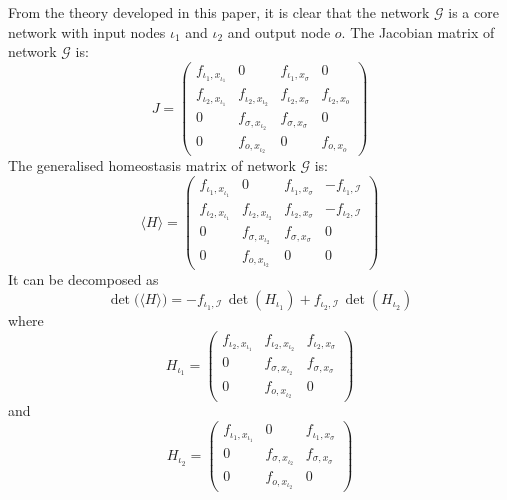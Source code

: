 \documentclass[a4paper,fleqn]{cas-dc}
\begin{document}
From the theory developed in this paper, it is clear that the network $\mathcal{G}$ is a core network with input nodes $\iota_{1}$ and $\iota_{2}$ and output node $o$.
The Jacobian matrix of network $\mathcal{G}$ is:
\begin{equation} \label{jacobian_matrix_e_coli}
J = 
\begin{pmatrix} 
f_{\iota_1, x_{\iota_1}} & 0 & f_{\iota_1, x_{\sigma}} & 0 \\
f_{\iota_2, x_{\iota_1}} & f_{\iota_2, x_{\iota_2}} & f_{\iota_2, x_{\sigma}} & f_{\iota_2, x_o} \\
0 & f_{\sigma, x_{\iota_2}} & f_{\sigma, x_{\sigma}} & 0 \\
0 & f_{o, x_{\iota_2}} & 0 & f_{o,x_o}
\end{pmatrix}
\end{equation}
The generalised homeostasis matrix of network $\mathcal{G}$ is:
\begin{equation} \label{homeostasis_matrix_e_coli}
\langle H \rangle = 
\begin{pmatrix} 
f_{\iota_1, x_{\iota_1}} & 0 & f_{\iota_1, x_{\sigma}} & -f_{\iota_1, \mathcal{I}} \\
f_{\iota_2, x_{\iota_1}} & f_{\iota_2, x_{\iota_2}} & f_{\iota_2, x_{\sigma}} & -f_{\iota_2, \mathcal{I}} \\
0 & f_{\sigma, x_{\iota_2}} & f_{\sigma, x_{\sigma}} & 0 \\
0 & f_{o, x_{\iota_2}} & 0 & 0
\end{pmatrix}
\end{equation}
It can be decomposed as
\begin{equation} \label{analysis_e_coli_part_i}
\det\big(\langle H \rangle\big) = -f_{\iota_1, \mathcal{I}} \, \det(H_{\iota_1}) + f_{\iota_2, \mathcal{I}} \, \det(H_{\iota_2})
\end{equation}
where
\[
H_{\iota_1} = \begin{pmatrix} 
f_{\iota_2, x_{\iota_1}} & f_{\iota_2, x_{\iota_2}} & f_{\iota_2, x_{\sigma}} \\
0 & f_{\sigma, x_{\iota_{2}}} & f_{\sigma, x_{\sigma}} \\
0 & f_{o, x_{\iota_2}} & 0 
\end{pmatrix} 
\]
and
\[
H_{\iota_2} = \begin{pmatrix} 
f_{\iota_1, x_{\iota_1}} & 0 & f_{\iota_1, x_{\sigma}} \\
0 & f_{\sigma, x_{\iota_2}} & f_{\sigma, x_{\sigma}} \\
0 & f_{o, x_{\iota_2}} & 0
\end{pmatrix}
\]
\end{document}
